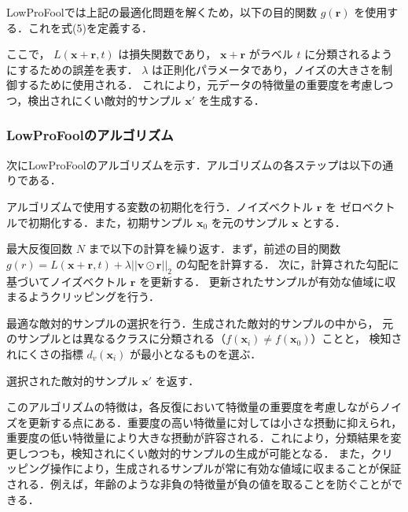 LowProFoolでは上記の最適化問題を解くため，以下の目的関数 $g(\bm{r})$ を使用する．これを式(5)を定義する．


ここで， $L(\bm{x}+\bm{r}, t)$ は損失関数であり， $\bm{x}+\bm{r}$ がラベル $t$ に分類されるようにするための誤差を表す． $\lambda$ は正則化パラメータであり，ノイズの大きさを制御するために使用される．
これにより，元データの特徴量の重要度を考慮しつつ，検出されにくい敵対的サンプル $\bm{x}'$ を生成する．

\subsubsection{LowProFoolのアルゴリズム}
次にLowProFoolのアルゴリズムを示す．アルゴリズムの各ステップは以下の通りである．
\begin{algorithm_step}
    \item[Step 1)] アルゴリズムで使用する変数の初期化を行う．ノイズベクトル $\bm{r}$ を
        ゼロベクトルで初期化する．また，初期サンプル $\bm{x}_0$ を元のサンプル $\bm{x}$ とする．
    
    \item[Step 2)] 最大反復回数 $N$ まで以下の計算を繰り返す．まず，前述の目的関数 
        $g(r) = L(\bm{x}+\bm{r}, t) + \lambda ||\bm{v} \odot \bm{r}||_2$ の勾配を計算する．
        次に，計算された勾配に基づいてノイズベクトル $\bm{r}$ を更新する．
        更新されたサンプルが有効な値域に収まるようクリッピングを行う．
    
    \item[Step 3)] 最適な敵対的サンプルの選択を行う．生成された敵対的サンプルの中から，
        元のサンプルとは異なるクラスに分類される（$f(\bm{x}_i) \neq f(\bm{x}_0)$）ことと，
        検知されにくさの指標 $d_v(\bm{x}_i)$ が最小となるものを選ぶ．
    
    \item[Step 4)] 選択された敵対的サンプル $\bm{x}'$ を返す．
    \end{algorithm_step}


このアルゴリズムの特徴は，各反復において特徴量の重要度を考慮しながらノイズを更新する点にある．重要度の高い特徴量に対しては小さな摂動に抑えられ，重要度の低い特徴量により大きな摂動が許容される．これにより，分類結果を変更しつつも，検知されにくい敵対的サンプルの生成が可能となる．
また，クリッピング操作により，生成されるサンプルが常に有効な値域に収まることが保証される．例えば，年齢のような非負の特徴量が負の値を取ることを防ぐことができる．



